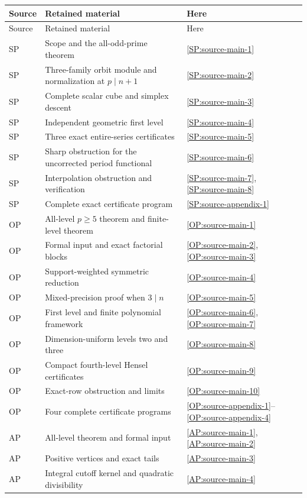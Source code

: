 \documentclass[11pt,a4paper]{article}
\theoremstyle{definition}\newtheorem{definition}[theorem]{Definition}
\theoremstyle{remark}\newtheorem{remark}[theorem]{Remark}
\numberwithin{equation}{section}
\begin{document}
\begin{longtable}{@{}p{}p{}p{}@{}}
\toprule Source & Retained material & Here\\\midrule\endfirsthead
\toprule Source & Retained material & Here\\\midrule\endhead
SP & Scope and the all-odd-prime theorem & \ref{SP:source-main-1}\\
SP & Three-family orbit module and normalization at $p\mid n+1$ & \ref{SP:source-main-2}\\
SP & Complete scalar cube and simplex descent & \ref{SP:source-main-3}\\
SP & Independent geometric first level & \ref{SP:source-main-4}\\
SP & Three exact entire-series certificates & \ref{SP:source-main-5}\\
SP & Sharp obstruction for the uncorrected period functional & \ref{SP:source-main-6}\\
SP & Interpolation obstruction and verification & \ref{SP:source-main-7}, \ref{SP:source-main-8}\\
SP & Complete exact certificate program & \ref{SP:source-appendix-1}\\
OP & All-level $p\ge5$ theorem and finite-level theorem & \ref{OP:source-main-1}\\
OP & Formal input and exact factorial blocks & \ref{OP:source-main-2}, \ref{OP:source-main-3}\\
OP & Support-weighted symmetric reduction & \ref{OP:source-main-4}\\
OP & Mixed-precision proof when $3\mid n$ & \ref{OP:source-main-5}\\
OP & First level and finite polynomial framework & \ref{OP:source-main-6}, \ref{OP:source-main-7}\\
OP & Dimension-uniform levels two and three & \ref{OP:source-main-8}\\
OP & Compact fourth-level Hensel certificates & \ref{OP:source-main-9}\\
OP & Exact-row obstruction and limits & \ref{OP:source-main-10}\\
OP & Four complete certificate programs & \ref{OP:source-appendix-1}--\ref{OP:source-appendix-4}\\
AP & All-level theorem and formal input & \ref{AP:source-main-1}, \ref{AP:source-main-2}\\
AP & Positive vertices and exact tails & \ref{AP:source-main-3}\\
AP & Integral cutoff kernel and quadratic divisibility & \ref{AP:source-main-4}\\

\end{longtable}
\end{document}
